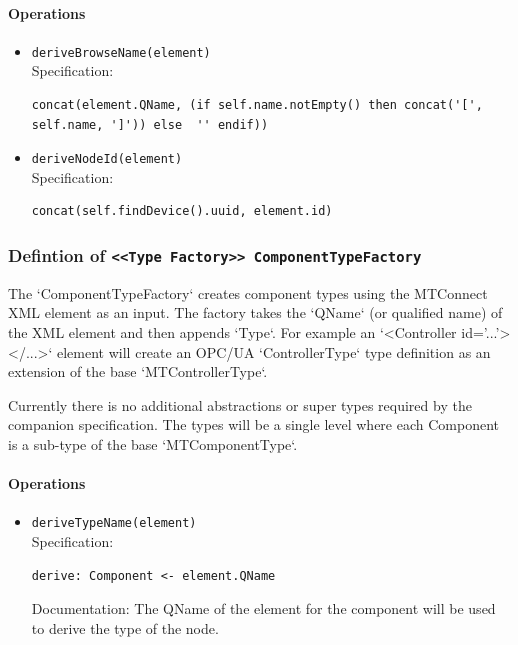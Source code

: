 \paragraph{Operations}
\begin{itemize}
  \item \texttt{deriveBrowseName(element)}\\
    Specification:
   \indent \begin{lstlisting}
concat(element.QName, (if self.name.notEmpty() then concat('[', self.name, ']')) else  '' endif))
\end{lstlisting}

  \item \texttt{deriveNodeId(element)}\\
    Specification:
   \indent \begin{lstlisting}
concat(self.findDevice().uuid, element.id)
\end{lstlisting}

\end{itemize}
\FloatBarrier
\subsubsection{Defintion of \texttt{<<Type Factory>> ComponentTypeFactory}} \label{type:ComponentTypeFactory}

\FloatBarrier

The `ComponentTypeFactory` creates component types using the MTConnect XML element as an input. 
The factory takes the `QName` (or qualified name) of the XML element and then appends `Type`. For 
example an `<Controller id='...'></...>` element will create an OPC/UA `ControllerType` type definition 
as an extension of the base `MTControllerType`. 

Currently there is no additional abstractions or super types required by the companion specification. 
The types will be a single level where each Component is a sub-type of the base `MTComponentType`.


\paragraph{Operations}
\begin{itemize}
  \item \texttt{deriveTypeName(element)}\\
    Specification:
   \indent \begin{lstlisting}
derive: Component <- element.QName
\end{lstlisting}

    Documentation: The QName of the element for the component will be used to derive the type of the node.

\end{itemize}
